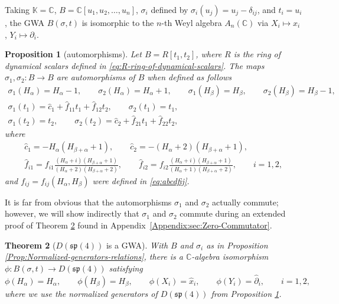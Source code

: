 \documentclass[10pt,a4paper]{amsart}
\numberwithin{equation}{section}
\newtheorem{Theorem}{Theorem}[section]
\newtheorem{Proposition}[Theorem]{Proposition}
 { \theoremstyle{definition}
\newtheorem{Definition}[Theorem]{Definition}
\newtheorem{Note}[Theorem]{Note}
\newtheorem{Example}[Theorem]{Example}
\newtheorem{Remark}[Theorem]{Remark} }
\begin{document}
\begin{Example}
	Taking $\mathbb{K}=\mathbb{C}$, $B=\mathbb{C}[u_1,u_2,\dots,u_n]$, $\sigma_i$ defined by $\sigma_i(u_j)=u_j-\delta_{ij}$, and $t_i=u_i$, the GWA $B(\sigma,t)$ is isomorphic to the $n$-th Weyl algebra $A_n(\mathbb{C})$ via $X_i\mapsto x_i$, $Y_i\mapsto \partial_i$.
\end{Example}

\begin{Proposition}[automorphisms]\label{Prop:Automorphisms}
	Let $B = R[t_{1},t_{2}]$, where $R$ is the ring of dynamical scalars defined in \eqref{eq:R-ring-of-dynamical-scalars}. The maps $\sigma_{1},\sigma_{2}\colon B \rightarrow B$ are automorphisms of $B$ when defined as follows
		\begin{gather*}
			\sigma_1(H_\alpha) =H_\alpha-1, \qquad \sigma_2(H_\alpha) =H_\alpha+1,\qquad
			\sigma_1(H_\beta) =H_\beta, \qquad \sigma_2(H_\beta) =H_\beta-1,\\
			\sigma_1(t_1) =\hat c_1+\hat f_{11}t_1+\hat f_{12}t_2,\qquad \sigma_2(t_1) =t_1,\\
			\sigma_1(t_2) =t_2, \qquad\sigma_2(t_2) =\hat c_2+\hat f_{21}t_1+\hat f_{22}t_2,
		\end{gather*}
	where
	\begin{gather*}
		\hat{c}_1 = -H_\alpha(H_{\beta+\alpha}+1),\qquad
		\hat{c}_2 = -(H_\alpha+2)(H_{\beta+\alpha}+1),\\
		\hat f_{i1} = f_{i1}\frac{(H_\alpha+i)(H_{\beta+\alpha}+1)}{(H_\alpha+2)(H_{\beta+\alpha}+2)},\qquad
		\hat f_{i2} = f_{i2}\frac{(H_\alpha+i)(H_{\beta+\alpha}+1)}{(H_\alpha+1)(H_{\beta+\alpha}+2)},\qquad i=1,2,
	\end{gather*}
	and $f_{ij}=f_{ij}(H_\alpha,H_\beta)$ were defined in \eqref{eq:abcdfij}.
	
\end{Proposition}

\begin{Remark}
	It is far from obvious that the automorphisms $\sigma_1$ and $\sigma_2$ actually commute; however, we will show indirectly that $\sigma_1$ and $\sigma_2$ commute during an extended proof of Theorem \ref{thm:GWA-realization} found in Appendix~\ref{Appendix:sec:Zero-Commutator}.
\end{Remark}


\begin{Theorem}[$D(\mathfrak{sp}(4))$ is a GWA]\label{thm:GWA-realization}
	With $B$ and $\sigma_{i}$ as in Proposition {\rm\ref{Prop:Normalized-generators-relations}}, there is a $\mathbb{C}$-algebra isomorphism
$\phi\colon B(\sigma,t) \longrightarrow D(\mathfrak{sp}(4))
$
	satisfying
	\[\phi(H_\alpha)=H_\alpha,\qquad
	\phi(H_\beta)=H_\beta,\qquad
	\phi(X_i)=\hat x_i,\qquad
	\phi(Y_i)=\hat \partial_i,\qquad i=1,2,
	\]
	where we use the normalized generators of $D(\mathfrak{sp}(4))$ from Proposition {\rm\ref{Prop:Automorphisms}}.
\end{Theorem}
\end{document}
